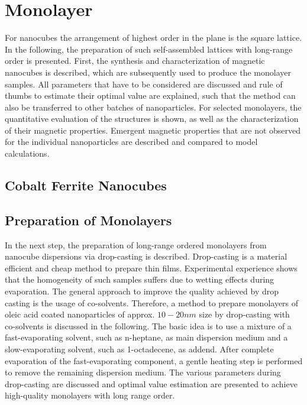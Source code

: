 \documentclass[\main/dresen_thesis.tex]{subfiles}
\renewcommand{\thisPath}{\main/chapters/monolayers}
\begin{document}
  \chapter{Monolayer}\label{ch:monolayers}
    For nanocubes the arrangement of highest order in the plane is the square lattice.
    In the following, the preparation of such self-assembled lattices with long-range order is presented.
    First, the synthesis and characterization of magnetic nanocubes is described, which are subsequently used to produce the monolayer samples.
    All parameters that have to be considered are discussed and rule of thumbs to estimate their optimal value are explained, such that the method can also be transferred to other batches of nanoparticles.
    For selected monolayers, the quantitative evaluation of the structures is shown, as well as the characterization of their magnetic properties. Emergent magnetic properties that are not observed for the individual nanoparticles are described and compared to model calculations.

    \section{Cobalt Ferrite Nanocubes}
      

    \section{Preparation of Monolayers}
      In the next step, the preparation of long-range ordered monolayers from nanocube dispersions via drop-casting is described.
      Drop-casting is a material efficient and cheap method to prepare thin films.
      Experimental experience shows that the homogeneity of such samples suffers due to wetting effects during evaporation.
      The general approach to improve the quality achieved by drop casting is the usage of co-solvents.
      Therefore, a method to prepare monolayers of oleic acid coated nanoparticles of approx. $10 - 20 \unit{nm}$ size by drop-casting with co-solvents is discussed in the following.
      The basic idea is to use a mixture of a fast-evaporating solvent, such as n-heptane, as main dispersion medium and a slow-evaporating solvent, such as 1-octadecene, as addend.
      After complete evaporation of the fast-evaporating component, a gentle heating step is performed to remove the remaining dispersion medium.
      The various parameters during drop-casting are discussed and optimal value estimation are presented to achieve high-quality monolayers with long range order.
\end{document}
